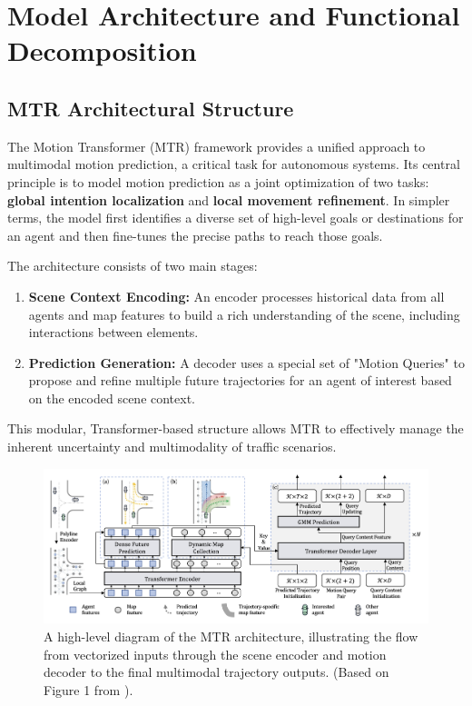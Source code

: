 \chapter{Model Architecture and Functional Decomposition}
\label{ch:model_architecture}

\section{MTR Architectural Structure}
\label{sec:model_mtr_architecture}

The Motion Transformer (MTR) framework provides a unified approach to multimodal motion prediction, a critical task for autonomous systems. Its central principle is to model motion prediction as a joint optimization of two tasks: \textbf{global intention localization} and \textbf{local movement refinement}. In simpler terms, the model first identifies a diverse set of high-level goals or destinations for an agent and then fine-tunes the precise paths to reach those goals.

The architecture consists of two main stages:
\begin{enumerate}
    \item \textbf{Scene Context Encoding:} An encoder processes historical data from all agents and map features to build a rich understanding of the scene, including interactions between elements.
    \item \textbf{Prediction Generation:} A decoder uses a special set of "Motion Queries" to propose and refine multiple future trajectories for an agent of interest based on the encoded scene context.
\end{enumerate}

This modular, Transformer-based structure allows MTR to effectively manage the inherent uncertainty and multimodality of traffic scenarios.

\begin{figure}[htbp]
    \centering
    \includegraphics[width=\textwidth]{figures/mtr_overall_architecture_detail.png}
    \caption{A high-level diagram of the MTR architecture, illustrating the flow from vectorized inputs through the scene encoder and motion decoder to the final multimodal trajectory outputs. (Based on Figure 1 from \cite{Shi2022MTR}).}
    \label{fig:mtr_architecture}
\end{figure}

